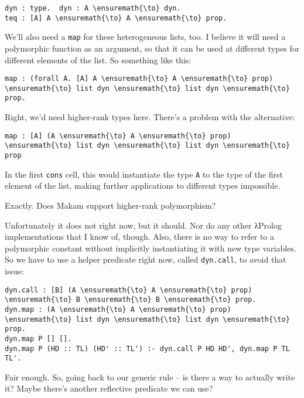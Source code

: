 \begin{verbatim}
dyn : type.  dyn : A \ensuremath{\to} dyn.
teq : [A] A \ensuremath{\to} A \ensuremath{\to} prop.
\end{verbatim}

\heroSTUDENT{} We'll also need a \texttt{map} for these heterogeneous lists,
too. I believe it will need a polymorphic function as an argument, so
that it can be used at different types for different elements of the
list. So something like this:

\begin{verbatim}
map : (forall A. [A] A \ensuremath{\to} A \ensuremath{\to} prop) \ensuremath{\to} list dyn \ensuremath{\to} list dyn \ensuremath{\to} prop.
\end{verbatim}

\heroADVISOR{} Right, we'd need higher-rank types here. There's a problem with
the alternative:

\begin{verbatim}
map : [A] (A \ensuremath{\to} A \ensuremath{\to} prop) \ensuremath{\to} list dyn \ensuremath{\to} list dyn \ensuremath{\to} prop
\end{verbatim}

\noindent
In the first \texttt{cons} cell, this would instantiate the type
\texttt{A} to the type of the first element of the list, making further
applications to different types impossible.

\heroSTUDENT{} Exactly. Does Makam support higher-rank polymorphism?

\heroADVISOR{} Unfortunately it does not right now, but it should. Nor do any
other \foreignlanguage{greek}{λ}Prolog implementations that I know of, though. Also, there is no
way to refer to a polymorphic constant without implicitly instantiating
it with new type variables. So we have to use a helper predicate right
now, called \texttt{dyn.call}, to avoid that issue:

\begin{verbatim}
dyn.call : [B] (A \ensuremath{\to} A \ensuremath{\to} prop) \ensuremath{\to} B \ensuremath{\to} B \ensuremath{\to} prop.
dyn.map : (A \ensuremath{\to} A \ensuremath{\to} prop) \ensuremath{\to} list dyn \ensuremath{\to} list dyn \ensuremath{\to} prop.
dyn.map P [] [].
dyn.map P (HD :: TL) (HD' :: TL') :- dyn.call P HD HD', dyn.map P TL TL'.
\end{verbatim}

\heroSTUDENT{} Fair enough. So, going back to our generic rule -- is there a
way to actually write it? Maybe there's another reflective predicate we
can use?

